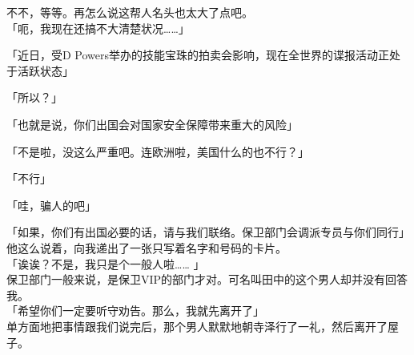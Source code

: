 不不，等等。再怎么说这帮人名头也太大了点吧。\\

「呃，我现在还搞不大清楚状况……」

「近日，受D Powers举办的技能宝珠的拍卖会影响，现在全世界的谍报活动正处于活跃状态」

「所以？」

「也就是说，你们出国会对国家安全保障带来重大的风险」

「不是啦，没这么严重吧。连欧洲啦，美国什么的也不行？」

「不行」

「哇，骗人的吧」

「如果，你们有出国必要的话，请与我们联络。保卫部门会调派专员与你们同行」\\

他这么说着，向我递出了一张只写着名字和号码的卡片。\\

「诶诶？不是，我只是个一般人啦…… 」\\

保卫部门一般来说，是保卫VIP的部门才对。可名叫田中的这个男人却并没有回答我。\\

「希望你们一定要听守劝告。那么，我就先离开了」\\

单方面地把事情跟我们说完后，那个男人默默地朝寺泽行了一礼，然后离开了屋子。\\

